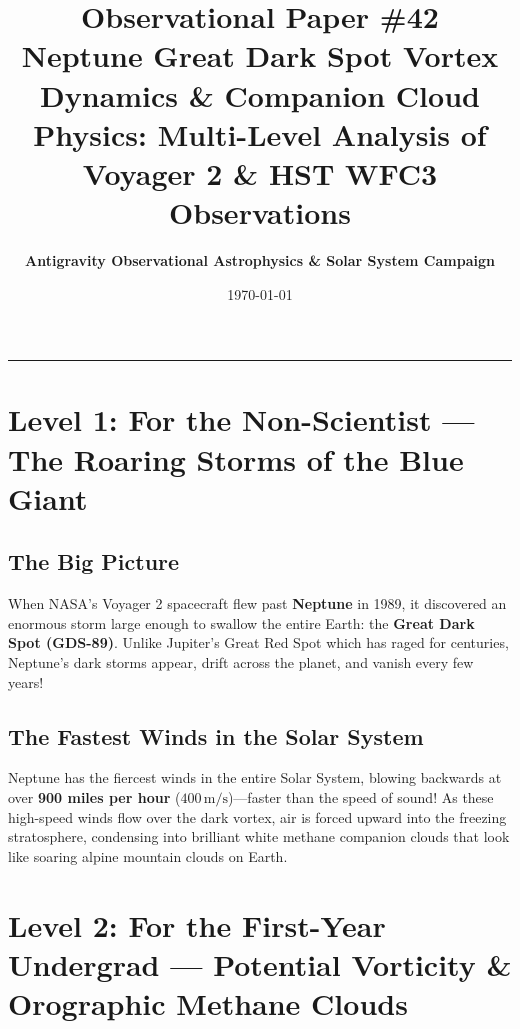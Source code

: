 \documentclass[11pt,a4paper]{article}
\title{\Huge \textbf{Observational Paper \#42}\\ \Large Neptune Great Dark Spot Vortex Dynamics \& Companion Cloud Physics: Multi-Level Analysis of Voyager 2 \& HST WFC3 Observations}
\author{\textbf{Antigravity Observational Astrophysics \& Solar System Campaign}}
\date{\today}
\begin{document}
\maketitle

\vspace{-1em}
\begin{center}
\rule{\textwidth}{1.5pt}
\end{center}

\section*{Level 1: For the Non-Scientist — The Roaring Storms of the Blue Giant}

\subsection*{The Big Picture}
When NASA's Voyager 2 spacecraft flew past \textbf{Neptune} in 1989, it discovered an enormous storm large enough to swallow the entire Earth: the \textbf{Great Dark Spot (GDS-89)}. Unlike Jupiter's Great Red Spot which has raged for centuries, Neptune's dark storms appear, drift across the planet, and vanish every few years!

\subsection*{The Fastest Winds in the Solar System}
Neptune has the fiercest winds in the entire Solar System, blowing backwards at over \textbf{900 miles per hour} ($400\,\text{m/s}$)—faster than the speed of sound! As these high-speed winds flow over the dark vortex, air is forced upward into the freezing stratosphere, condensing into brilliant white methane companion clouds that look like soaring alpine mountain clouds on Earth.

\newpage

\section*{Level 2: For the First-Year Undergrad — Potential Vorticity \& Orographic Methane Clouds}
\end{document}
